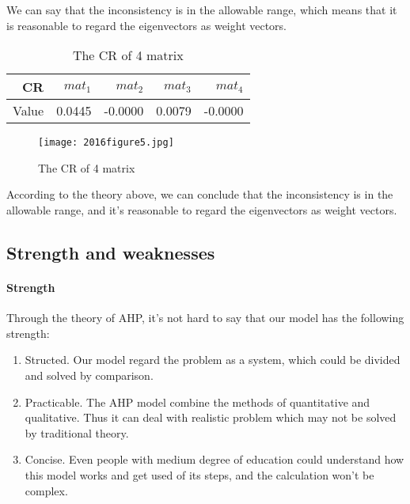 We can say that the inconsistency is in the allowable range, which means that it is reasonable to regard the eigenvectors as weight vectors.

\begin{table}[htbp]
  \centering
  \caption{The CR of 4 matrix}
    \begin{tabular}{rrrrr}
    \toprule
    CR    & $mat_1$ & $mat_2$ & $mat_3$ & $mat_4$ \\
    \midrule
    Value & 0.0445 & -0.0000     & 0.0079 & -0.0000 \\
    \bottomrule
    \end{tabular}%
  \label{tab:cr}%
\end{table}%


\begin{figure}[h]
      \texttt{[image: 2016figure5.jpg]}
      \caption{The CR of 4 matrix}\label{fig:cr}
 \end{figure}

According to the theory above, we can conclude that the inconsistency is in the allowable range, and it's reasonable to regard the eigenvectors as weight vectors.

%


\subsection{Strength and weaknesses}

\paragraph{Strength}

Through the theory of AHP, it's not hard to say that our model has the following strength:
\begin{enumerate}
\item Structed. Our model regard the problem as a system, which could be divided and solved by comparison.
\item Practicable. The AHP model combine the methods of quantitative and qualitative. Thus it can deal with realistic problem which may not be solved by traditional theory.
\item Concise. Even people with medium degree of education could understand how this model works and get used of its steps, and the calculation won't be complex.

\end{enumerate}

